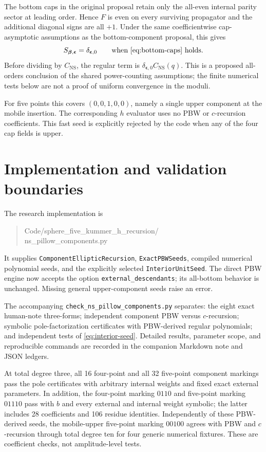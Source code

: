 \documentclass[11pt]{article}
\newcommand{\NS}{\mathrm{NS}}
\newcommand{\eps}{\boldsymbol\epsilon}
\newcommand{\bet}{\boldsymbol\beta}
\begin{document}
The bottom caps in the original proposal retain only the all-even
internal parity sector at leading order.  Hence $F$ is even on every
surviving propagator and the additional diagonal signs are all $+1$.
Under the same coefficientwise cap-asymptotic assumptions as the
bottom-component proposal, this gives
\begin{equation}\label{eq:interior-seed}
 S_{\bet,\eps}=\delta_{\eps,0}\qquad\text{when \eqref{eq:bottom-caps} holds}.
\end{equation}
Before dividing by $C_{\NS}$, the regular term is
$\delta_{\eps,0}C_{\NS}(q)$.  This is a proposed all-orders conclusion
of the shared power-counting assumptions; the finite numerical tests
below are not a proof of uniform convergence in the moduli.

For five points this covers $(0,0,1,0,0)$, namely a single upper
component at the mobile insertion.  The corresponding $h$ evaluator
uses no PBW or $c$-recursion coefficients.  This fast seed is explicitly
rejected by the code when any of the four cap fields is upper.

\section{Implementation and validation boundaries}

The research implementation is
\begin{quote}\ttfamily\small
Code/sphere\_five\_kummer\_h\_recursion/\\
ns\_pillow\_components.py
\end{quote}
It supplies \texttt{ComponentEllipticRecursion},
\texttt{ExactPBWSeeds}, compiled numerical polynomial seeds, and the
explicitly selected \texttt{InteriorUnitSeed}.
The direct PBW engine now accepts the option
\texttt{external\_\allowbreak descendants}; its all-bottom behavior is
unchanged.  Missing general upper-component seeds raise an error.

The accompanying \texttt{check\_ns\_pillow\_components.py} separates:
the eight exact human-note three-forms; independent component PBW versus
$c$-recursion; symbolic pole-factorization certificates with PBW-derived
regular polynomials; and independent tests of \eqref{eq:interior-seed}.
Detailed results, parameter scope, and reproducible commands are recorded
in the companion Markdown note and JSON ledgers.

At total degree three, all 16 four-point and all 32 five-point component
markings pass the pole certificates with arbitrary internal weights and
fixed exact external parameters.  In addition, the four-point marking
$0110$ and five-point marking $01110$ pass with $b$ and every external
and internal weight symbolic; the latter includes 28 coefficients and
106 residue identities.  Independently of these PBW-derived seeds,
the mobile-upper five-point marking $00100$ agrees with PBW and
$c$-recursion through total degree ten for four generic numerical
fixtures.  These are coefficient checks, not amplitude-level tests.
\end{document}
